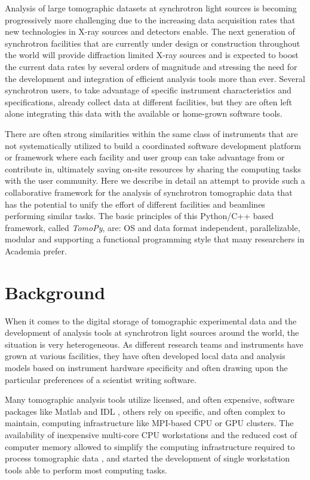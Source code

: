 \documentclass[pdf]{iucr}              %
\begin{document}
Analysis of large tomographic datasets at synchrotron light sources is becoming progressively more challenging  due to the increasing data acquisition rates that new technologies in X-ray sources and detectors enable. The next generation of synchrotron facilities that are currently under design or construction throughout the world will provide diffraction limited X-ray sources and is expected to boost the current data rates by several orders of magnitude and stressing the need for the development and integration of efficient analysis tools more than ever. Several synchrotron users, to take advantage of specific instrument characteristics and specifications,  already collect data at different facilities, but they are often left alone integrating this data with the available or home-grown software tools.

There are often strong similarities within the same class of instruments that are not systematically utilized to build a coordinated software development platform or framework where each facility and user group can take advantage from or contribute in, ultimately saving on-site resources by sharing the computing tasks with the user community. Here we describe in detail an attempt to provide such a collaborative framework for the analysis of synchrotron tomographic data that has the potential to unify the effort of different facilities and beamlines performing similar tasks. The basic principles of this  Python/C++ based framework, called {\it TomoPy}, are: OS and data format independent, parallelizable, modular and supporting a functional programming style that many researchers in Academia prefer. 


\section{Background}

When it comes to the digital storage of tomographic experimental data and the development of analysis tools at synchrotron light sources around the world, the situation is very heterogeneous. As different research teams and instruments have grown at various facilities, they have often developed local data and analysis models based on instrument hardware specificity and often drawing upon the particular preferences of a scientist writing software. 

Many tomographic analysis tools utilize licensed, and often expensive, software packages like Matlab \cite{matlab} and IDL \cite{exelis_vis}, others rely on specific, and often complex to maintain, computing infrastructure like MPI-based CPU or GPU clusters. The availability of inexpensive multi-core CPU workstations and the reduced cost of computer memory  allowed to simplify the computing infrastructure required to process tomographic data \cite{rivers_spie_2012}, and started the development of single workstation tools able to perform most computing tasks. 
\end{document}
